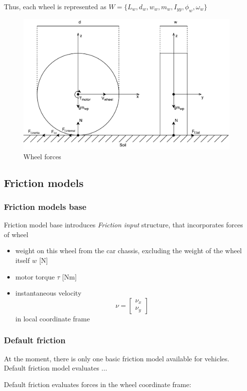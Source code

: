 \documentclass[a4paper,11pt]{article}
\begin{document}
Thus, each wheel is represented as $W = \{L_w, d_w, w_w, m_w, I_{yy}, \phi_w, \omega_w\}$

\begin{figure}[h!]
  \centerline{\includegraphics[width=0.7\linewidth]{imgs/wheel_forces}}
  \caption{Wheel forces}
  \label{fig:wheel_forces}
\end{figure}


\subsection{Friction models} \label{sec:friction_models}
\subsubsection{Friction models base}
Friction model base introduces \textit{Friction input} structure, that incorporates forces of wheel
\begin{itemize}
\item weight on this wheel from the car chassis, excluding the weight of the wheel itself $w$ [N]
\item motor torque $\tau$ [Nm]
\item instantaneous velocity
\[\nu = \begin{bmatrix}
\nu_x \\
\nu_y
\end{bmatrix}\] in local coordinate frame
\end{itemize}

\subsubsection{Default friction}\label{sec:default_friction}
At the moment, there is only one basic friction model available for vehicles.
Default friction model evaluates ...

Default friction evaluates forces in the wheel coordinate frame:
\end{document}
